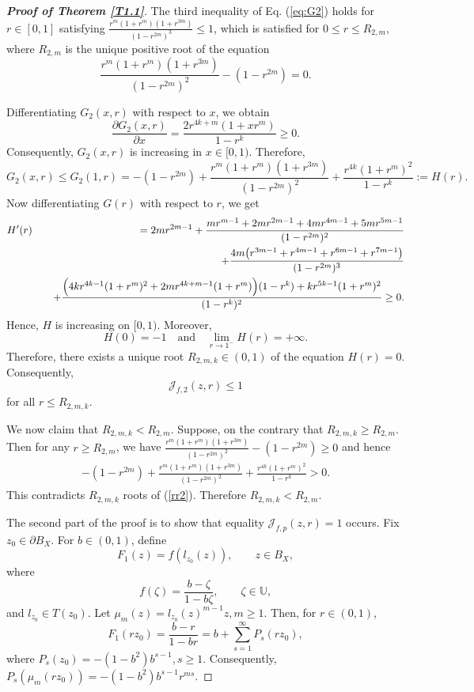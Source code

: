 \documentclass[11pt, reqno]{amsart}
\newtheorem*{cor A}{Corollary A}
\newtheorem*{cor B}{Corollary B}
\newcommand{\beas}{\begin{eqnarray*}}
\newcommand{\eeas}{\end{eqnarray*}}
\numberwithin{equation}{section}
\begin{document}
\begin{proof}[{\bf Proof of Theorem \ref{T1.1}}]
The third inequality of Eq. (\ref{eq:G2}) holds for $r\in [0,1]$ satisfying $\frac{r^m(1+r^m)(1+r^{3m})}{(1-r^{2m})^3}\leq 1$, which is satisfied for $0\leq r\leq R_{2,m}$, where $R_{2,m}$ is the unique positive root of the equation 
\[\frac{r^m(1+r^m)(1+r^{3m})}{(1-r^{2m})^2}-(1-r^{2m})=0.\]

Differentiating $G_2(x,r)$ with respect to $x$, we obtain
\[
\frac{\partial G_2(x,r)}{\partial x}
=\frac{2r^{4k+m}(1+xr^m)}{1-r^k}\ge 0.
\]
Consequently, $G_2(x,r)$ is increasing in $x\in[0,1)$. Therefore,
\[
G_2(x,r)\le G_2(1,r)
=-(1-r^{2m})+\frac{r^m(1+r^m)(1+r^{3m})}{(1-r^{2m})^2}+\frac{r^{4k}(1+r^m)^2}{1-r^k}:=H(r).
\]
Now differentiating $G(r)$ with respect to $r$, we get 
\beas
H'(r)
&&=2m r^{2m-1}+
\frac{m r^{m-1}+2m r^{2m-1}+4m r^{4m-1}+5m r^{5m-1}}
     {(1-r^{2m})^2} \\
&&\quad+
\frac{4m\bigl(r^{3m-1}+r^{4m-1}+r^{6m-1}+r^{7m-1}\bigr)}
     {(1-r^{2m})^3} \\
&&\quad+
\frac{
\Bigl(4k r^{4k-1}(1+r^m)^2
+2m r^{4k+m-1}(1+r^m)\Bigr)(1-r^k)
+k r^{5k-1}(1+r^m)^2
}
{(1-r^k)^2}
\ge 0.
\eeas
Hence, $H$ is increasing on $[0,1)$. Moreover,
\[
H(0)=-1
\quad\text{and}\quad
\lim_{r\to 1^-}H(r)=+\infty.
\]
Therefore, there exists a unique root $R_{2,m,k}\in(0,1)$ of the equation $H(r)=0$. Consequently,
\[
\mathcal{J}_{f,2}(z,r)\le 1\]
for all $r\le R_{2,m,k}$.


 
We now claim that $R_{2,m,k}<R_{2,m}$. Suppose, on the contrary that $R_{2,m,k}\geq R_{2,m}$. Then for any $r\geq R_{2,m}$, we have $\frac{r^m(1+r^m)(1+r^{3m})}{(1-r^{2m})^2}-(1-r^{2m})\geq  0$ and hence 
\beas -(1-r^{2m})+\frac{r^m(1+r^m)(1+r^{3m})}{(1-r^{2m})^2}+\frac{r^{4k}(1+r^m)^2}{1-r^k}>0.\eeas
This contradicts $R_{2,m,k}$ roots of (\ref{rr2}). Therefore $R_{2,m,k} < R_{2,m}$.

\medskip
The second part of the proof is to show that equality $\mathcal{J}_{f,p}(z,r)=1$ occurs.
Fix $z_0\in\partial B_X$. For $b\in(0,1)$, define
\begin{equation}\label{F1}
F_1(z)=f(l_{z_0}(z)),\qquad z\in B_X,
\end{equation}
where
\[
f(\zeta)=\frac{b-\zeta}{1-b\zeta},\qquad \zeta\in\mathbb{U},
\]
and $l_{z_0}\in T(z_0)$. Let $\mu_m(z)=l_{z_0}(z)^{m-1}z, m\geq 1.$ Then, for $r\in(0,1)$,
\[
F_1(rz_0)=\frac{b-r}{1-br}
=b+\sum_{s=1}^{\infty}P_s(rz_0),
\]
where $P_s(z_0)=-(1-b^2)b^{s-1}, s\ge1.$ Consequently, $P_s(\mu_m(rz_0))=-(1-b^2)b^{s-1}r^{ms}.$


\end{proof}
\end{document}

